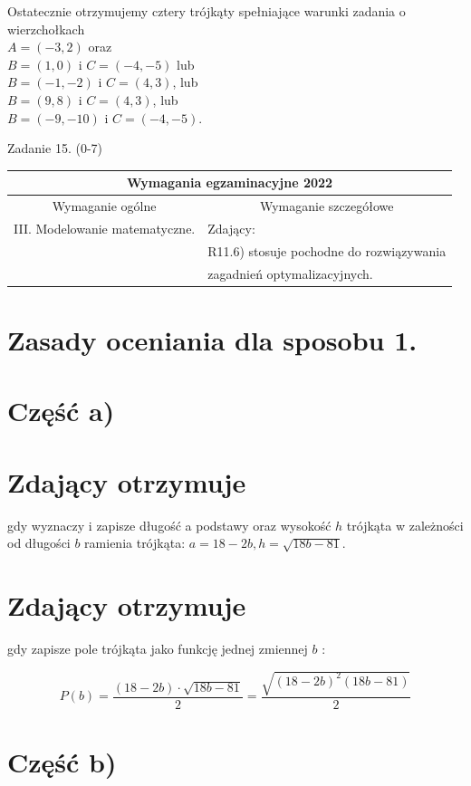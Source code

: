 \documentclass[10pt]{article}
\begin{document}
Ostatecznie otrzymujemy cztery trójkąty spełniające warunki zadania o wierzchołkach\\
$A=(-3,2)$ oraz\\
$B=(1,0)$ i $C=(-4,-5)$ lub\\
$B=(-1,-2)$ i $C=(4,3)$, lub\\
$B=(9,8)$ i $C=(4,3)$, lub\\
$B=(-9,-10)$ i $C=(-4,-5)$.

Zadanie 15. (0-7)

\begin{center}
\begin{tabular}{|l|l|}
\hline
\multicolumn{2}{|c|}{Wymagania egzaminacyjne 2022} \\
\hline
\multicolumn{1}{|c|}{Wymaganie ogólne} & \multicolumn{1}{c|}{Wymaganie szczegółowe} \\
\hline
III. Modelowanie matematyczne. & Zdający: \\
 & R11.6) stosuje pochodne do rozwiązywania \\
 & zagadnień optymalizacyjnych. \\
\hline
\end{tabular}
\end{center}

\section*{Zasady oceniania dla sposobu 1.}
\section*{Część a)}
\section*{Zdający otrzymuje}
gdy wyznaczy i zapisze długość a podstawy oraz wysokość $h$ trójkąta w zależności od długości $b$ ramienia trójkąta: $a=18-2 b, h=\sqrt{18 b-81}$.

\section*{Zdający otrzymuje}
gdy zapisze pole trójkąta jako funkcję jednej zmiennej $b$ :

$$
P(b)=\frac{(18-2 b) \cdot \sqrt{18 b-81}}{2}=\frac{\sqrt{(18-2 b)^{2}(18 b-81)}}{2}
$$

\section*{Część b)}
\end{document}
